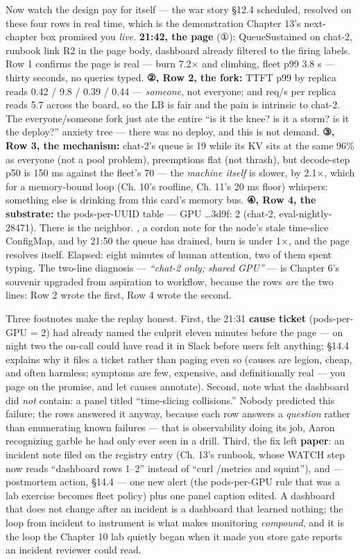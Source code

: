 Now watch the design pay for itself — the war story §12.4 scheduled, resolved on these four rows in real time, which is the demonstration Chapter 13’s next-chapter box promised you \textit{live}. \textbf{21:42, the page} (①): QueueSustained on chat-2, runbook link R2 in the page body, dashboard already filtered to the firing labels. Row 1 confirms the page is real — burn 7.2× and climbing, fleet p99 3.8 s — thirty seconds, no queries typed. \textbf{②, Row 2, the fork:} TTFT p99 by replica reads 0.42 / 9.8 / 0.39 / 0.44 — \textit{someone}, not everyone; and req/s per replica reads 5.7 across the board, so the LB is fair and the pain is intrinsic to chat-2. The everyone/someone fork just ate the entire “is it the knee? is it a storm? is it the deploy?” anxiety tree — there was no deploy, and this is not demand. \textbf{③, Row 3, the mechanism:} chat-2’s queue is 19 while its KV sits at the same 96\% as everyone (not a pool problem), preemptions flat (not thrash), but decode-step p50 is 150 ms against the fleet’s 70 — the \textit{machine itself} is slower, by 2.1×, which for a memory-bound loop (Ch. 10’s roofline, Ch. 11’s 20 ms floor) whispers: something else is drinking from this card’s memory bus. \textbf{④, Row 4, the substrate:} the pods-per-UUID table — GPU …3d9f: 2 (chat-2, eval-nightly-28471). There is the neighbor. , a cordon note for the node’s stale time-slice ConfigMap, and by 21:50 the queue has drained, burn is under 1×, and the page resolves itself. Elapsed: eight minutes of human attention, two of them spent typing. The two-line diagnosis — \textit{“chat-2 only; shared GPU”} — is Chapter 6’s souvenir upgraded from aspiration to workflow, because the rows \textit{are} the two lines: Row 2 wrote the first, Row 4 wrote the second.

Three footnotes make the replay honest. First, the 21:31 \textbf{cause ticket} (pods-per-GPU = 2) had already named the culprit eleven minutes before the page — on night two the on-call could have read it in Slack before users felt anything; §14.4 explains why it files a ticket rather than paging even so (causes are legion, cheap, and often harmless; symptoms are few, expensive, and definitionally real — you page on the promise, and let causes annotate). Second, note what the dashboard did \textit{not} contain: a panel titled “time-slicing collisions.” Nobody predicted this failure; the rows answered it anyway, because each row answers a \textit{question} rather than enumerating known failures — that is observability doing its job, Aaron recognizing garble he had only ever seen in a drill. Third, the fix left \textbf{paper}: an incident note filed on the registry entry (Ch. 13’s runbook, whose WATCH step now reads “dashboard rows 1–2” instead of “curl /metrics and squint”), and — postmortem action, §14.4 — one new alert (the pods-per-GPU rule that was a lab exercise becomes fleet policy) plus one panel caption edited. A dashboard that does not change after an incident is a dashboard that learned nothing; the loop from incident to instrument is what makes monitoring \textit{compound}, and it is the loop the Chapter 10 lab quietly began when it made you store gate reports an incident reviewer could read.

